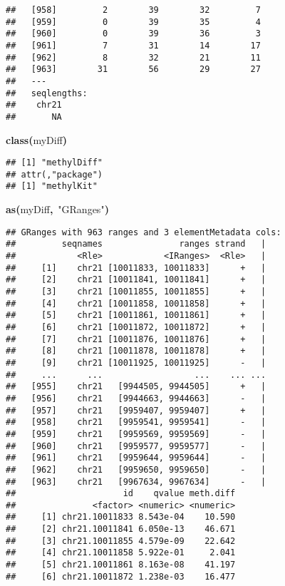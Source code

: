 \documentclass{article}
\makeatletter
\newcommand{\hlfunctioncall}[1]{\textcolor[rgb]{.5,0,.33}{\textbf{#1}}}%
\newcommand{\hlstring}[1]{\textcolor[rgb]{.6,.6,1}{#1}}%
\newcommand{\hlkeyword}[1]{\textbf{#1}}%
\newcommand{\hlsymbol}[1]{#1}%
\newenvironment{kframe}{%
 \def\FrameCommand##1{\hskip\@totalleftmargin \hskip-\fboxsep
 \colorbox{shadecolor}{##1}\hskip-\fboxsep
     \hskip-\linewidth \hskip-\@totalleftmargin \hskip\columnwidth}%
 \MakeFramed {\advance\hsize-\width
   \@totalleftmargin\z@ \linewidth\hsize
   \@setminipage}}%
 {\par\unskip\endMakeFramed}
\newenvironment{knitrout}{}{} %
\makeatother
\begin{document}
\begin{knitrout}
\begin{kframe}
\begin{verbatim}
##   [958]         2        39        32         7
##   [959]         0        39        35         4
##   [960]         0        39        36         3
##   [961]         7        31        14        17
##   [962]         8        32        21        11
##   [963]        31        56        29        27
##   ---
##   seqlengths:
##    chr21
##       NA
\end{verbatim}
\begin{flushleft}
\ttfamily\noindent
\hlfunctioncall{class}\hlkeyword{(}\hlsymbol{myDiff}\hlkeyword{)}\mbox{}
\normalfont
\end{flushleft}
\begin{verbatim}
## [1] "methylDiff"
## attr(,"package")
## [1] "methylKit"
\end{verbatim}
\begin{flushleft}
\ttfamily\noindent
\hlfunctioncall{as}\hlkeyword{(}\hlsymbol{myDiff}\hlkeyword{,}{\ }\hlstring{"{}GRanges"{}}\hlkeyword{)}\mbox{}
\normalfont
\end{flushleft}
\begin{verbatim}
## GRanges with 963 ranges and 3 elementMetadata cols:
##         seqnames               ranges strand   |
##            <Rle>            <IRanges>  <Rle>   |
##     [1]    chr21 [10011833, 10011833]      +   |
##     [2]    chr21 [10011841, 10011841]      +   |
##     [3]    chr21 [10011855, 10011855]      +   |
##     [4]    chr21 [10011858, 10011858]      +   |
##     [5]    chr21 [10011861, 10011861]      +   |
##     [6]    chr21 [10011872, 10011872]      +   |
##     [7]    chr21 [10011876, 10011876]      +   |
##     [8]    chr21 [10011878, 10011878]      +   |
##     [9]    chr21 [10011925, 10011925]      -   |
##     ...      ...                  ...    ... ...
##   [955]    chr21   [9944505, 9944505]      +   |
##   [956]    chr21   [9944663, 9944663]      -   |
##   [957]    chr21   [9959407, 9959407]      +   |
##   [958]    chr21   [9959541, 9959541]      -   |
##   [959]    chr21   [9959569, 9959569]      -   |
##   [960]    chr21   [9959577, 9959577]      -   |
##   [961]    chr21   [9959644, 9959644]      -   |
##   [962]    chr21   [9959650, 9959650]      -   |
##   [963]    chr21   [9967634, 9967634]      -   |
##                     id    qvalue meth.diff
##               <factor> <numeric> <numeric>
##     [1] chr21.10011833 8.543e-04    10.590
##     [2] chr21.10011841 6.050e-13    46.671
##     [3] chr21.10011855 4.579e-09    22.642
##     [4] chr21.10011858 5.922e-01     2.041
##     [5] chr21.10011861 8.163e-08    41.197
##     [6] chr21.10011872 1.238e-03    16.477

\end{verbatim}
\end{kframe}
\end{knitrout}
\end{document}
